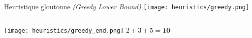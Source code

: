         \begin{frame}{Heuristique gloutonne \textit{(Greedy Lower Bound)}}
            \centering
            \texttt{[image: heuristics/greedy.png]}

            \vspace{0.19cm}
            \begin{columns}
                \begin{column}{0.5\textwidth}
                    \begin{center}
                        \texttt{[image: heuristics/greedy\_end.png]}
                        \Large$\boxed{2 + 3 + 5 = \mathbf{10}}$
                    \end{center}
                \end{column}%

                \begin{column}{0.5\textwidth}
                \end{column}
            \end{columns}
        \end{frame}

